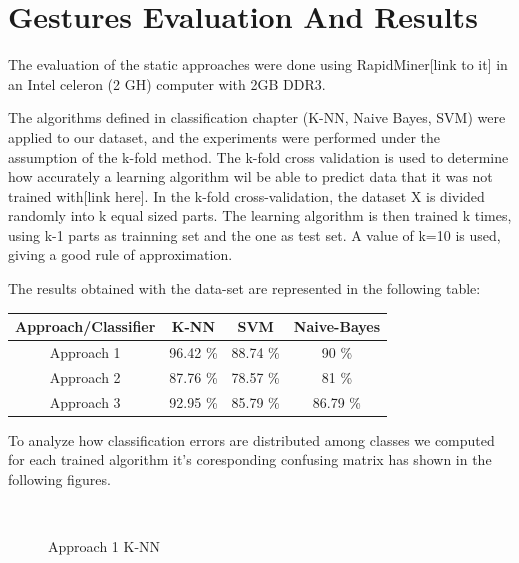 \chapter{Gestures Evaluation And Results}
The evaluation of the static approaches were done using RapidMiner[link to it] in an Intel celeron (2 GH) computer with 2GB DDR3.\bigskip

The algorithms defined in classification chapter (K-NN, Naive Bayes, SVM) were applied to our dataset, and the experiments were performed under the assumption of the k-fold method. The k-fold cross validation is used to determine how accurately a learning algorithm wil be able to predict data that it was not trained with[link here]. In the k-fold cross-validation, the dataset X is divided randomly into k equal sized parts. The learning algorithm is then trained k times, using k-1 parts as trainning set and the one as test set. A value of k=10 is used, giving a good rule of approximation.
\bigskip

The results obtained with the data-set are represented in the following table:\bigskip

\begin{center}
\begin{tabular}{ |c|c|c|c| }
 \hline
 Approach/Classifier & K-NN & SVM & Naive-Bayes \\
 \hline
 Approach 1 & 96.42 \%  & 88.74 \%  & 90 \%  \\
 \hline
 Approach 2 & 87.76 \%  & 78.57 \%  & 81 \%  \\
 \hline
 Approach 3 & 92.95 \%  & 85.79 \%  & 86.79 \% \\
 \hline
\end{tabular}
\end{center}


To analyze how classification errors are distributed among classes we computed for each trained algorithm it's coresponding confusing matrix has shown in the following figures.\bigskip

\begin{figure}[h]
\begin{dBox}
\centering
 \mbox{
  }
  \caption{Approach 1 K-NN\label{fig:apr1_knn} }   
\end{dBox}   
\end{figure}

